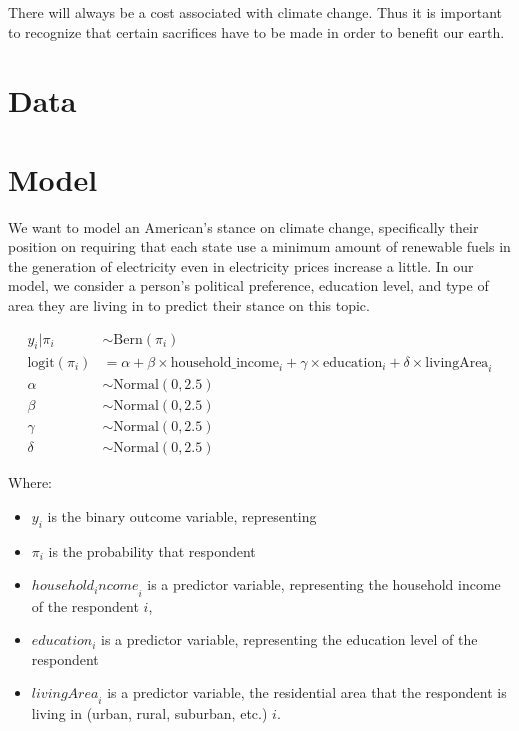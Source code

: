 \documentclass[
  letterpaper,
  DIV=11,
  numbers=noendperiod]{scrartcl}
\providecommand{\tightlist}{%
  \setlength{\itemsep}{0pt}\setlength{\parskip}{0pt}}\usepackage{longtable,booktabs,array}
\begin{document}
There will always be a cost associated with climate change. Thus it is
important to recognize that certain sacrifices have to be made in order
to benefit our earth.

\hypertarget{sec-data}{%
\section{Data}\label{sec-data}}

\hypertarget{model}{%
\section{Model}\label{model}}

We want to model an American's stance on climate change, specifically
their position on requiring that each state use a minimum amount of
renewable fuels in the generation of electricity even in electricity
prices increase a little. In our model, we consider a person's political
preference, education level, and type of area they are living in to
predict their stance on this topic.

\begin{align} 
y_i|\pi_i &\sim \mbox{Bern}(\pi_i) \\
\mbox{logit}(\pi_i) &= \alpha + \beta \times \mbox{household_income}_i + \gamma \times \mbox{education}_i + \delta \times \mbox{livingArea}_i\\
\alpha &\sim \mbox{Normal}(0, 2.5) \\
\beta &\sim \mbox{Normal}(0, 2.5) \\
\gamma &\sim \mbox{Normal}(0, 2.5) \\
\delta &\sim \mbox{Normal}(0, 2.5)
\end{align}

Where:

\begin{itemize}
\tightlist
\item
  \(y_i\) is the binary outcome variable, representing
\item
  \(\pi_i\) is the probability that respondent
\item
  \({household_income}_i\) is a predictor variable, representing the
  household income of the respondent \(i\),
\item
  \({education}_i\) is a predictor variable, representing the education
  level of the respondent
\item
  \({livingArea}_i\) is a predictor variable, the residential area that
  the respondent is living in (urban, rural, suburban, etc.) \(i\).
\end{itemize}
\end{document}
